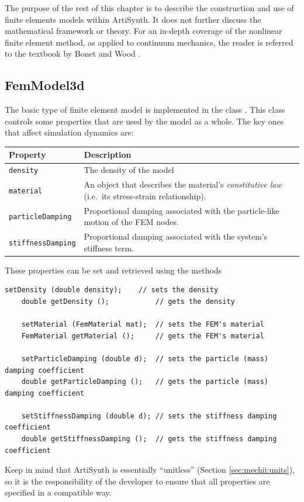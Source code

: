 The purpose of the rest of this chapter is to describe the construction and
use of finite elements models within ArtiSynth.  It does not further discuss 
the mathematical framework or theory.
For an in-depth coverage of the nonlinear finite element method, as applied
to continuum mechanics, the reader is referred to the textbook by Bonet and 
Wood \cite{bonet:fem:2000}.

\subsection{FemModel3d}
\label{sec:fem:structure}

The basic type of finite element model is implemented in the class 
.  This class controls some
properties that are used by the model as a whole.  The key ones that affect
simulation dynamics are:
\begin{center}
\begin{tabular}{|ll|}
\hline
Property & Description\\
\hline
{\tt density} & The density of the model\\
{\tt material} & An object that describes the material's 
\emph{constitutive law} (i.e.~its stress-strain relationship).\\
{\tt particleDamping} & Proportional damping associated with the 
particle-like motion of the FEM nodes.\\
{\tt stiffnessDamping} & Proportional damping associated with the 
system's stiffness term.\\
\hline
\end{tabular}
\end{center}
These properties can be set and retrieved using the methods
\begin{lstlisting}[]
    setDensity (double density);    // sets the density
    double getDensity ();           // gets the density

    setMaterial (FemMaterial mat);  // sets the FEM's material
    FemMaterial getMaterial ();     // gets the FEM's material

    setParticleDamping (double d);  // sets the particle (mass) damping coefficient
    double getParticleDamping ();   // gets the particle (mass) damping coefficient

    setStiffnessDamping (double d); // sets the stiffness damping coefficient
    double getStiffnessDamping ();  // gets the stiffness damping coefficient
\end{lstlisting}
Keep in mind that ArtiSynth is essentially ``unitless'' (Section 
\ref{sec:mechii:units}), so it is the responsibility of the developer to
ensure that all properties are specified in a compatible way.  

